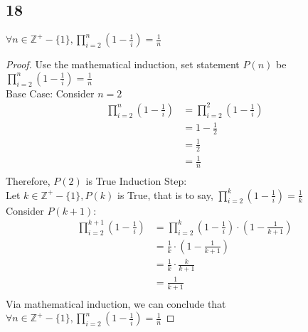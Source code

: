 \documentclass{article}
\begin{document}
\subsection{18}
$\forall n \in \mathbb{Z^+} - \{1\},\prod _{i=2}^{n} (1-\frac{1}{i}) = \frac{1}{n}$
\begin{proof}
    Use the mathematical induction, set statement $P(n)$ be $\prod _{i=2}^{n} (1-\frac{1}{i}) = \frac{1}{n}$\\
    Base Case: Consider $n = 2$\\
    \begin{align*}
        \prod_{i = 2} ^{n} (1-\frac{1}{i}) &= \prod_{i = 2} ^{2} (1-\frac{1}{i}) \tag{By substitution}\\
        &= 1-\frac{1}{2}\\
        &= \frac{1}{2} \tag{By algebra}\\
        &= \frac{1}{n} \tag{By substitution}\\
    \end{align*}
    Therefore, $P(2)$ is True
    Induction Step: \\
    Let $k \in \mathbb{Z^+} - \{1\}, P(k)$ is True, that is to say, $\prod _{i=2}^{k} (1-\frac{1}{i}) = \frac{1}{k}$\\
    Consider $P(k+1)$:\\
    \begin{align*}
        \prod_{i=2}^{k+1} (1-\frac{1}{i}) &= \prod_{i=2}^k ( 1-\frac{1}{i}) \cdot(1-\frac{1}{k+1}) \tag{By algebra}\\
        &= \frac{1}{k} \cdot (1-\frac{1}{k+1}) \tag{By substitution}\\
        &= \frac{1}{k} \cdot \frac{k}{k+1}\\
        &= \frac{1}{k+1}\tag{By Algebra}\\
    \end{align*}
    Via mathematical induction, we can conclude that $\forall n \in \mathbb{Z^+} - \{1\},\prod _{i=2}^{n} (1-\frac{1}{i}) = \frac{1}{n}$
\end{proof}
\end{document}
